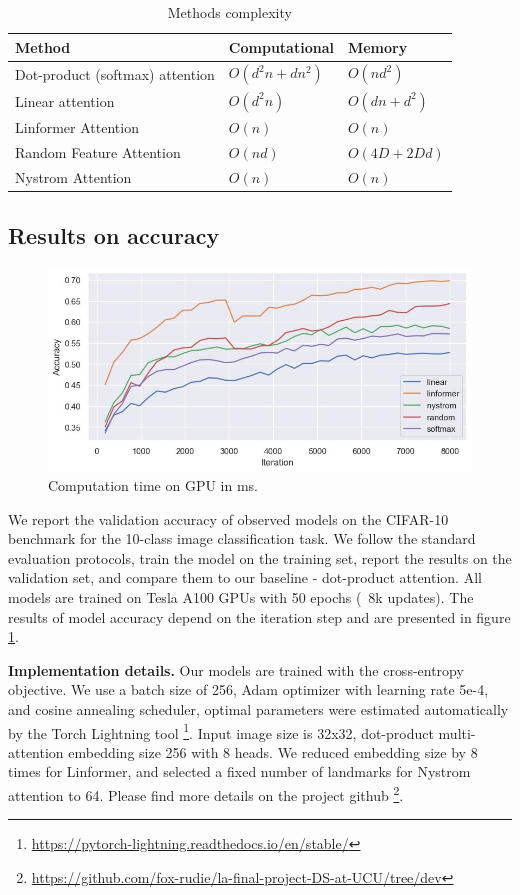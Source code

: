\begin{table}
\centering
\begin{tabular}{l|l|l}
Method & Computational & Memory & \\\hline
Dot-product (softmax) attention & $O(d^2n+dn^2)$ &  $O(nd^2)$ \\
Linear attention & $O(d^2n)$ & $ O(dn+d^2) $  \\
Linformer Attention & $O(n)$ & $ O(n) $ \\
Random Feature Attention & $O(nd)$ & $O(4D + 2Dd)$ \\
Nystrom Attention & $O(n)$ & $O(n)$
\end{tabular}
\caption{\label{tab:mem-complexity}Methods complexity}
\end{table}


\subsection{Results on accuracy}

\begin{figure}[!h]
	\centering
	\includegraphics[scale=0.5]{attention-accuracy.jpg}
	\caption{Computation time on GPU in ms.}
	\label{fig:attention-accuracy}
\end{figure}

We report the validation accuracy of observed models on the CIFAR-10 \cite{cifar-10}  benchmark for the 10-class image classification task. We follow the standard evaluation protocols, train the model on the training set, report the results on the validation set, and compare them to our baseline - dot-product attention. All models are trained on Tesla A100 GPUs with 50 epochs (~8k updates). The results of model accuracy depend on the iteration step and are presented in figure \ref{fig:attention-accuracy}.

\textbf{Implementation details.} Our models are trained with the cross-entropy objective. We use a batch size of 256, Adam optimizer with learning rate 5e-4, and cosine annealing scheduler, optimal parameters were estimated automatically by the Torch Lightning tool \footnote{\url{https://pytorch-lightning.readthedocs.io/en/stable/}}. Input image size is 32x32, dot-product multi-attention embedding size 256 with 8 heads. We reduced embedding size by 8 times for Linformer, and selected a fixed number of landmarks for Nystrom attention to 64.
 Please find more details on the project github \footnote{\url{https://github.com/fox-rudie/la-final-project-DS-at-UCU/tree/dev}}.



